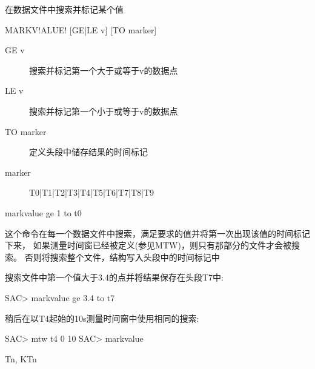 \label{cmd:markvalue}

在数据文件中搜索并标记某个值

\begin{SACSTX}
MARKV!ALUE! [GE|LE v] [TO marker]
\end{SACSTX}

\begin{description}
\item [GE v] 搜索并标记第一个大于或等于v的数据点 
\item [LE v] 搜索并标记第一个小于或等于v的数据点 
\item [TO marker] 定义头段中储存结果的时间标记 
\item [marker] T0|T1|T2|T3|T4|T5|T6|T7|T8|T9 
\end{description}

\begin{SACDFT}
markvalue ge 1 to t0
\end{SACDFT}

这个命令在每一个数据文件中搜索，满足要求的值并将第一次出现该值的时间标记下来，
如果测量时间窗已经被定义(参见MTW)，则只有那部分的文件才会被搜索。
否则将搜索整个文件，结构写入头段中的时间标记中

搜索文件中第一个值大于3.4的点并将结果保存在头段T7中:
\begin{SACCode}
SAC> markvalue ge 3.4 to t7
\end{SACCode}

稍后在以T4起始的10s测量时间窗中使用相同的搜索:
\begin{SACCode}
SAC> mtw t4 0 10
SAC> markvalue
\end{SACCode}

Tn, KTn

